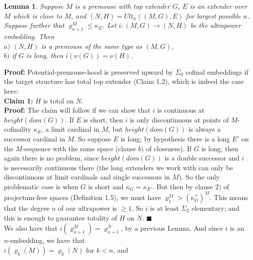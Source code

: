 \documentclass[12pt]{article}
\newtheorem{lem}[thm]{Lemma}
\begin{document}
\begin{lem}  Suppose $M$ is a premouse with top extender $G$, $E$ is an extender over $M$ which is close to $M$, and $(N, H) = Ult_n ((M, G), E)$ for largest possible $n$.  Suppose further that $\varrho_{n+1}^M \leq \kappa_E$.  Let $i : (M, G) \longrightarrow (N, H)$ be the ultrapower embedding.  Then\\

\indent $a)$ $(N, H)$ is a premouse of the same type as $(M, G)$,\\

\indent $b)$ if $G$ is long, then $i (\nu (G)) = \nu (H)$.
\end{lem}



\textbf{Proof:} Potential-premouse-hood is preserved upward by $\Sigma_0$ cofinal embeddings if the target structure has total top extender (Claim 1.2), which is indeed the case here:\\

\textbf{Claim 1:} $H$ is total on $N$.\\

\textbf{Proof:}  The claim will follow if we can show that $i$ is continuous at $height(dom(G))$. If $E$ is short, then $i$ is only discontinuous at points of $M$-cofinality $\kappa_E$, a limit cardinal in $M$, but $height(dom(G))$ is always a successor cardinal in $M$.  So suppose $E$ is long; by hypothesis there is a long $E'$ on the $M$-sequence with the same space (clause $b)$ of closeness).  If $G$ is long, then again there is no problem, since $height(dom(G))$ is a double successor and $i$ is necessarily continuous there (the long extenders we work with can only be discontinuous at limit cardinals and single successors in $M$).  So the only problematic case is when $G$ is short and $\kappa_G = \kappa_{E'}$.  But then by clause $2)$ of projectum-free spaces (Definition 1.5), we must have $\varrho_1^M > (\kappa_G^+)^M$.  This means that the degree $n$ of our ultrapower is $ \geq 1$.  So $i$ is at least $\Sigma_2$ elementary; and this is enough to guarantee totality of $H$ on $N$.  $\blacksquare$\\

We also have that $i ( \varrho_{n+1}^M ) = \varrho_{n+1}^N$, by a previous Lemma.  And since $i$ is an $n$-embedding, we have that\\

\indent $i ( \varrho_k (M)) = \varrho_k (N)$ for $k < n$, and\\
\end{document}

